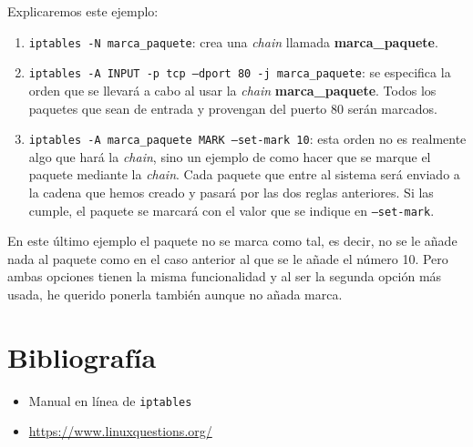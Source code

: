 \documentclass[11pt,a4paper]{article}
\begin{document}
Explicaremos este ejemplo:

\begin{enumerate}
	\item \texttt{iptables -N marca\_paquete}: crea una \textit{chain} llamada \textbf{marca\_paquete}.
	\item \texttt{iptables -A INPUT -p tcp --dport 80 -j marca\_paquete}: se especifica la orden que se llevará a cabo al usar la \textit{chain} \textbf{marca\_paquete}. Todos los paquetes que sean de entrada y provengan del puerto 80 serán marcados.
	\item \texttt{iptables -A marca\_paquete MARK --set-mark 10}: esta orden no es realmente algo que hará la \textit{chain}, sino un ejemplo de como hacer que se marque el paquete mediante la \textit{chain}. Cada paquete que entre al sistema será enviado a la cadena que hemos creado y pasará por las dos reglas anteriores. Si las cumple, el paquete se marcará con el valor que se indique en \texttt{--set-mark}.
\end{enumerate}

En este último ejemplo el paquete no se marca como tal, es decir, no se le añade nada al paquete como en el caso anterior al que se le añade el número 10. Pero ambas opciones tienen la misma funcionalidad y al ser la segunda opción más usada, he querido ponerla también aunque no añada marca.

\section{Bibliografía}
\begin{itemize}
	\item Manual en línea de \texttt{iptables}
	\item {\color{blue} \url{https://www.linuxquestions.org/}}
\end{itemize}
\end{document}

